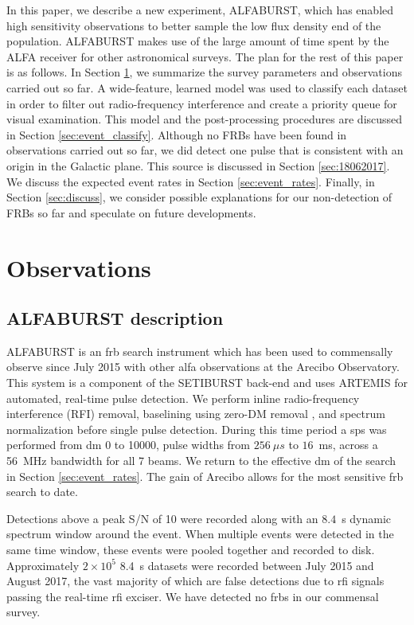 \documentclass[a4paper,fleqn,usenatbib]{mnras}
\begin{document}
In this paper, we describe a new experiment, ALFABURST, which has enabled high
sensitivity observations to better sample the low flux density end of the
population. ALFABURST makes use of the large amount of time spent by the ALFA
receiver for other astronomical surveys. The plan for the rest of this paper is
as follows. In Section \ref{sec:overview}, we summarize the survey parameters
and observations carried out so far.  A wide-feature, learned model was used to
classify each dataset in order to filter out radio-frequency interference and
create a priority queue for visual examination. This model and the
post-processing procedures are discussed in Section \ref{sec:event_classify}.
Although no FRBs have been found in observations carried out so far, we did
detect one pulse that is consistent with an origin in the Galactic plane. This
source is discussed in Section \ref{sec:18062017}. We discuss the expected event
rates in Section \ref{sec:event_rates}. Finally, in Section \ref{sec:discuss},
we consider possible explanations for our non-detection of FRBs so far and
speculate on future developments.

\section{Observations}
\label{sec:overview}

\subsection{ALFABURST description}

ALFABURST is an \gls{frb} search instrument which has been used to commensally
observe since July 2015 with other \gls{alfa} observations at the Arecibo
Observatory. This system is a component of the SETIBURST back-end
\citep{2017ApJS..228...21C} and uses ARTEMIS \citep{2015MNRAS.452.1254K} for
automated, real-time pulse detection. We perform inline radio-frequency
interference (RFI) removal, baselining using zero-DM removal
\citep{2009MNRAS.395..410E}, and spectrum normalization before single pulse
detection. During this time period a \gls{sps} was performed from \gls{dm} 0 to
10000, pulse widths from $256~\mu s$ to $16$~ms, across a 56~MHz bandwidth for
all 7 beams. We return to the effective \gls{dm} of the search in Section
\ref{sec:event_rates}. The gain of Arecibo allows for the most sensitive
\gls{frb} search to date.

Detections above a peak S/N of 10 were recorded along with an $8.4$~s dynamic
spectrum window around the event. When multiple events were detected in the same
time window, these events were pooled together and recorded to disk.
Approximately $2 \times 10^5$ 8.4~s datasets were recorded between July 2015 and
August 2017, the vast majority of which are false detections due to \gls{rfi}
signals passing the real-time \gls{rfi} exciser. We have detected no \glspl{frb}
in our commensal survey.
\end{document}
